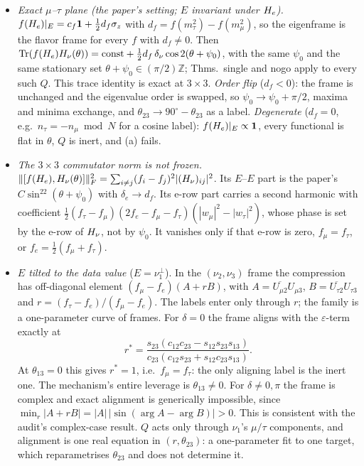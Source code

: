 \begin{itemize}
\item \emph{Exact $\mu$--$\tau$ plane (the paper's setting; $E$ invariant under $H_e$).}
  $f(H_e)|_E=c_f\mathbf 1+\tfrac12 d_f\sigma_z$ with $d_f=f(m_\tau^2)-f(m_\mu^2)$, so the eigenframe
  is the flavor frame for every $f$ with $d_f\neq0$. Then
  $\operatorname{Tr}(f(H_e)H_\nu(\theta))=\mathrm{const}+\tfrac12 d_f\,\delta_\nu\cos2(\theta+\psi_0)$, with the
  same $\psi_0$ and the same stationary set $\theta+\psi_0\in(\pi/2)\mathbb Z$; Thms.~single and
  nogo apply to every such $Q$. This trace identity is exact at $3\times3$.
  \emph{Order flip} ($d_f<0$): the frame is unchanged and the eigenvalue order is swapped, so
  $\psi_0\to\psi_0+\pi/2$, maxima and minima exchange, and $\theta_{23}\to90^\circ-\theta_{23}$
  as a label. \emph{Degenerate} ($d_f=0$, e.g.\ $n_\tau=-n_\mu \bmod N$ for a cosine label):
  $f(H_e)|_E\propto\mathbf 1$, every functional is flat in $\theta$, $Q$ is inert, and (a) fails.
\item \emph{The $3\times3$ commutator norm is not frozen.}
  $\lVert [f(H_e),H_\nu(\theta)] \rVert_F^2=\sum_{i\neq j}(f_i-f_j)^2|(H_\nu)_{ij}|^2$. Its $E$--$E$ part is
  the paper's $C\sin^22(\theta+\psi_0)$ with $\delta_e\to d_f$. Its e-row part carries a second
  harmonic with coefficient $\tfrac12(f_\tau-f_\mu)(2f_e-f_\mu-f_\tau)(|w_\mu|^2-|w_\tau|^2)$,
  whose phase is set by the e-row of $H_\nu$, not by $\psi_0$. It vanishes only if that e-row is
  zero, $f_\mu=f_\tau$, or $f_e=\tfrac12(f_\mu+f_\tau)$.
\item \emph{$E$ tilted to the data value} ($E=\nu_1^\perp$). In the $(\nu_2,\nu_3)$ frame the
  compression has off-diagonal element $(f_\mu-f_e)(A+rB)$, with
  $A=\overline{U_{\mu2}}U_{\mu3}$, $B=\overline{U_{\tau2}}U_{\tau3}$ and
  $r=(f_\tau-f_e)/(f_\mu-f_e)$. The labels enter only through $r$; the family is a one-parameter
  curve of frames. For $\delta=0$ the frame aligns with the $\varepsilon$-term exactly at
  \[
    r^*=\frac{s_{23}(c_{12}c_{23}-s_{12}s_{23}s_{13})}{c_{23}(c_{12}s_{23}+s_{12}c_{23}s_{13})}.
  \]
  At $\theta_{13}=0$ this gives $r^*=1$, i.e.\ $f_\mu=f_\tau$: the only aligning label is the inert
  one. The mechanism's entire leverage is $\theta_{13}\neq0$. For $\delta\neq0,\pi$ the frame is
  complex and exact alignment is generically impossible, since
  $\min_r|A+rB|=|A|\,|\sin(\arg A-\arg B)|>0$. This is consistent with the audit's complex-case
  result. $Q$ acts only through $\nu_1$'s $\mu/\tau$ components, and alignment is one real equation
  in $(r,\theta_{23})$: a one-parameter fit to one target, which reparametrises $\theta_{23}$ and
  does not determine it.
\end{itemize}
